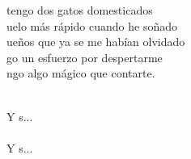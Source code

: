 \begin{cancion}
	 tengo dos gatos domesticados\\
\jump
	uelo más rápido cuando he soñado\\
	ueños que ya se me habían olvidado\\
	go un esfuerzo por despertarme\\
	ngo algo mágico que contarte.\\\jump\\
	\begin{chorus}%
	Y s... \\
\jump
	       \\
	Y s... \\
	\end{chorus}%
	\jump\\
\end{cancion}%
